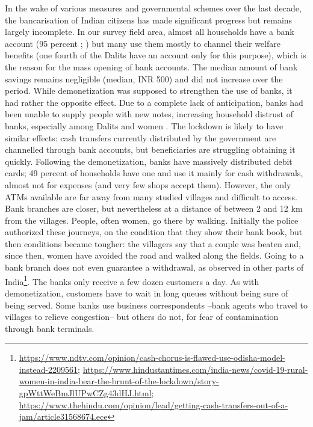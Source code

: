 \documentclass[a4paper, 11pt, onecolumn]{article}
\begin{document}
In the wake of various measures and governmental schemes over the last decade, the bancarisation of Indian citizens has made significant progress but remains largely incomplete. 
In our survey field area, almost all households have a bank account (95 percent ; \citealp[table 3]{Guerin2017}) but many use them mostly to channel their welfare benefits (one fourth of the Dalits have an account only for this purpose), which is the reason for the mass opening of bank accounts. 
The median amount of bank savings remains negligible (median, INR 500) and did not increase over the period. 
While demonetization was supposed to strengthen the use of banks, it had rather the opposite effect. 
Due to a complete lack of anticipation, banks had been unable to supply people with new notes, increasing household distrust of banks, especially among Dalits and women \citep{Guerin2017}. 
The lockdown is likely to have similar effects: cash transfers currently distributed by the government are channelled through bank accounts, but beneficiaries are struggling obtaining it quickly. 
Following the demonetization, banks have massively distributed debit cards; 49 percent of households have one and use it mainly for cash withdrawals, almost not for expenses (and very few shops accept them). 
However, the only ATMs available are far away from many studied villages and difficult to access. 
Bank branches are closer, but nevertheless at a distance of between 2 and 12 km from the villages.
People, often women, go there by walking. 
Initially the police authorized these journeys, on the condition that they show their bank book, but then conditions became tougher: the villagers say that a couple was beaten and, since then, women have avoided the road and walked along the fields. 
Going to a bank branch does not even guarantee a withdrawal, as observed in other parts of India\footnote{\url{https://www.ndtv.com/opinion/cash-chorus-is-flawed-use-odisha-model-instead-2209561}; \url{https://www.hindustantimes.com/india-news/covid-19-rural-women-in-india-bear-the-brunt-of-the-lockdown/story-gpWttWeBmJlUPwCZg43dHJ.html}; \url{https://www.thehindu.com/opinion/lead/getting-cash-transfers-out-of-a-jam/article31568674.ece}}. 
The banks only receive a few dozen customers a day. 
As with demonetization, customers have to wait in long queues without being sure of being served. 
Some banks use business correspondents --bank agents who travel to villages to relieve congestion-- but others do not, for fear of contamination through bank terminals. 
\end{document}

